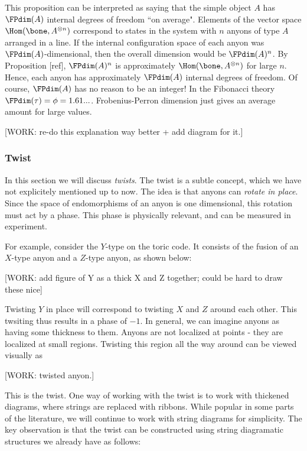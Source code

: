 This proposition can be interpreted as saying that the simple object $A$ has $\FPdim(A)$ internal degrees of freedom ``on average". Elements of the vector space $\Hom(\bone,A^{\otimes n})$ correspond to states in the system with $n$ anyons of type $A$ arranged in a line. If the internal configuration space of each anyon was $\FPdim(A)$-dimensional, then the overall dimension would be $\FPdim(A)^n$. By Proposition [ref], $\FPdim(A)^n$ is approximately $\Hom(\bone,A^{\otimes n})$ for large $n$. Hence, each anyon has approximately $\FPdim(A)$ internal degrees of freedom. Of course, $\FPdim(A)$ has no reason to be an integer! In the Fibonacci theory $\FPdim(\tau)=\phi=1.61...$. Frobenius-Perron dimension just gives an average amount for large values.

[WORK: re-do this explanation way better + add diagram for it.]

\subsubsection{Twist}

In this section we will discuss \textit{twists}. The twist is a subtle concept, which we have not explicitely mentioned up to now. The idea is that anyons can \textit{rotate in place}. Since the space of endomorphisms of an anyon is one dimensional, this rotation must act by a phase. This phase is physically relevant, and can be measured in experiment.

For example, consider the $Y$-type on the toric code. It consists of the fusion of an $X$-type anyon and a $Z$-type anyon, as shown below:

[WORK: add figure of Y as a thick X and Z together; could be hard to draw these nice]

Twisting $Y$ in place will correspond to twisting $X$ and $Z$ around each other. This twsiting thus results in a phase of $-1$. In general, we can imagine anyons as having some thickness to them. Anyons are not localized at points - they are localized at small regions. Twisting this region all the way around can be viewed visually as

[WORK: twisted anyon.]

This is the twist. One way of working with the twist is to work with thickened diagrams, where strings are replaced with ribbons. While popular in some parts of the literature, we will continue to work with string diagrams for simplicity. The key observation is that the twist can be constructed using string diagramatic structures we already have as follows:

